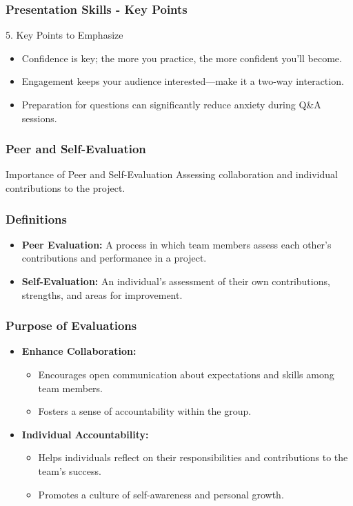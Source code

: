 \documentclass{beamer}
\begin{document}
\begin{frame}[fragile]
    \frametitle{Presentation Skills - Key Points}
    \begin{block}{5. Key Points to Emphasize}
        \begin{itemize}
            \item Confidence is key; the more you practice, the more confident you'll become.
            \item Engagement keeps your audience interested—make it a two-way interaction.
            \item Preparation for questions can significantly reduce anxiety during Q\&A sessions.
        \end{itemize}
    \end{block}
\end{frame}

\begin{frame}[fragile]
    \frametitle{Peer and Self-Evaluation}
    
    \begin{block}{Importance of Peer and Self-Evaluation}
        Assessing collaboration and individual contributions to the project.
    \end{block}
\end{frame}

\begin{frame}[fragile]
    \frametitle{Definitions}
    
    \begin{itemize}
        \item \textbf{Peer Evaluation:} A process in which team members assess each other’s contributions and performance in a project.
        \item \textbf{Self-Evaluation:} An individual’s assessment of their own contributions, strengths, and areas for improvement.
    \end{itemize}
\end{frame}

\begin{frame}[fragile]
    \frametitle{Purpose of Evaluations}
    
    \begin{itemize}
        \item \textbf{Enhance Collaboration:}
        \begin{itemize}
            \item Encourages open communication about expectations and skills among team members.
            \item Fosters a sense of accountability within the group.
        \end{itemize}

        \item \textbf{Individual Accountability:}
        \begin{itemize}
            \item Helps individuals reflect on their responsibilities and contributions to the team's success.
            \item Promotes a culture of self-awareness and personal growth.
        \end{itemize}
    \end{itemize}
\end{frame}
\end{document}
